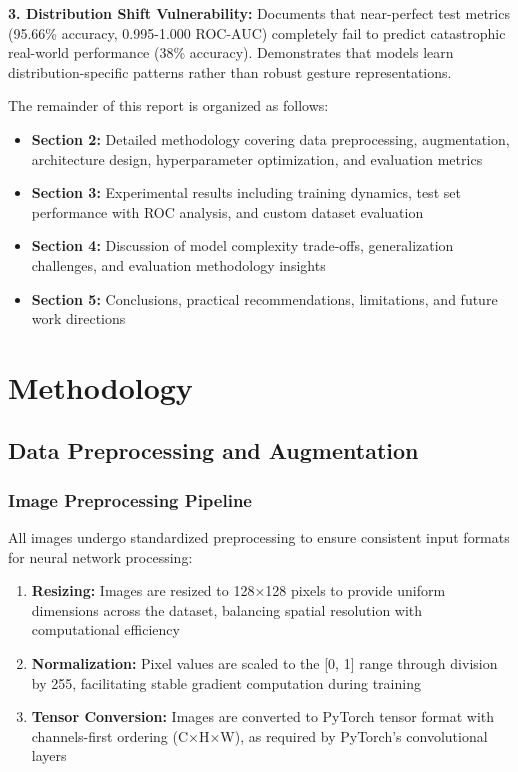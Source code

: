 \documentclass[12pt,a4paper]{article}
\begin{document}
\textbf{3. Distribution Shift Vulnerability:} Documents that near-perfect test metrics (95.66\% accuracy, 0.995-1.000 ROC-AUC) completely fail to predict catastrophic real-world performance (38\% accuracy). Demonstrates that models learn distribution-specific patterns rather than robust gesture representations.

The remainder of this report is organized as follows:

\begin{itemize}
    \item \textbf{Section 2:} Detailed methodology covering data preprocessing, augmentation, architecture design, hyperparameter optimization, and evaluation metrics
    \item \textbf{Section 3:} Experimental results including training dynamics, test set performance with ROC analysis, and custom dataset evaluation
    \item \textbf{Section 4:} Discussion of model complexity trade-offs, generalization challenges, and evaluation methodology insights
    \item \textbf{Section 5:} Conclusions, practical recommendations, limitations, and future work directions
\end{itemize}

\section{Methodology}

\subsection{Data Preprocessing and Augmentation}

\subsubsection{Image Preprocessing Pipeline}

All images undergo standardized preprocessing to ensure consistent input formats for neural network processing:

\begin{enumerate}
    \item \textbf{Resizing:} Images are resized to 128×128 pixels to provide uniform dimensions across the dataset, balancing spatial resolution with computational efficiency
    \item \textbf{Normalization:} Pixel values are scaled to the [0, 1] range through division by 255, facilitating stable gradient computation during training
    \item \textbf{Tensor Conversion:} Images are converted to PyTorch tensor format with channels-first ordering (C×H×W), as required by PyTorch's convolutional layers
\end{enumerate}
\end{document}

